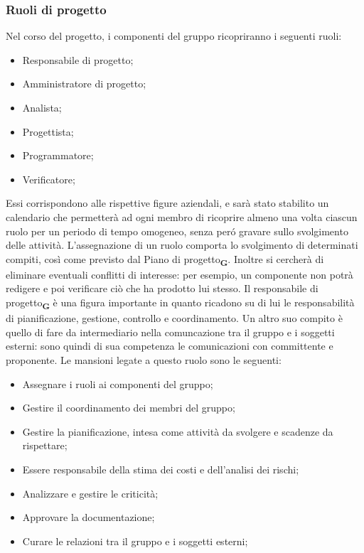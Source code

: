 \subsubsection{Ruoli di progetto}
Nel corso del progetto, i componenti del gruppo ricopriranno i seguenti ruoli:
\begin {itemize}
    \item Responsabile di progetto;
    \item Amministratore di progetto;
    \item Analista;
    \item Progettista;
    \item Programmatore;
    \item Verificatore;
\end {itemize}
Essi corrispondono alle rispettive figure aziendali, e sarà stato stabilito un calendario che permetterà ad ogni membro di ricoprire almeno una volta ciascun ruolo per un periodo di tempo omogeneo, senza peró gravare sullo svolgimento delle attività. L’assegnazione di un ruolo comporta lo svolgimento di determinati compiti, così come previsto dal Piano di progetto\textsubscript{\textbf{G}}. Inoltre si cercherà di eliminare eventuali conflitti di interesse: per esempio, un componente non potrà redigere e poi verificare ciò che ha prodotto lui stesso.
Il responsabile di progetto\textsubscript{\textbf{G}} è una figura importante in quanto ricadono su di lui le responsabilità di pianificazione, gestione, controllo e coordinamento. Un altro suo compito è quello di fare da intermediario nella comuncazione tra il gruppo e i soggetti esterni: sono quindi di sua competenza le comunicazioni con committente e proponente.
Le mansioni legate a questo ruolo sono le seguenti:
\begin {itemize}
    \item Assegnare i ruoli ai componenti del gruppo;
    \item Gestire il coordinamento dei membri del gruppo;
    \item Gestire la pianificazione, intesa come attività da svolgere e scadenze da rispettare;
    \item Essere responsabile della stima dei costi e dell’analisi dei rischi;
    \item Analizzare e gestire le criticità;
    \item Approvare la documentazione;
    \item Curare le relazioni tra il gruppo e i soggetti esterni;
\end {itemize}
